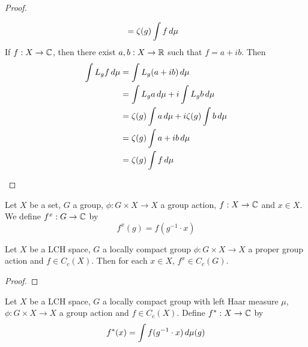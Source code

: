 \documentclass{book}
\begin{document}
\begin{proof}
\begin{enumerate}
\begin{align*}
			&= \zeta(g) \int f \, d \mu 
		\end{align*} 
		If $f:X \rightarrow \mathbb{C}$, then there exist $a,b:X \rightarrow \mathbb{R}$ such that $f = a + ib$. Then 
		\begin{align*}
			\int L_g f \, d \mu
			&= \int L_g(a + i b) \, d \mu \\
			&= \int L_g a \, d \mu +i \int L_g b \, d \mu \\
			&= \zeta(g) \int a \, d \mu + i \zeta(g) \int b \, d \mu \\
			&= \zeta(g) \int a + ib \, d \mu \\
			&= \zeta(g) \int f \, d \mu 
		\end{align*} 
		\end{enumerate}
	\end{proof}

	\begin{defn}
		Let $X$ be a set, $G$ a group, $\phi: G \times X \rightarrow X$ a group action, $f :X \rightarrow \mathbb{C}$ and $x \in X$. We define $f^x: G \rightarrow \mathbb{C}$ by $$f^x(g) = f(g^{-1} \cdot x)$$
	\end{defn}

	\begin{ex}
		Let $X$ be a LCH space, $G$ a locally compact group $\phi: G \times X \rightarrow X$ a proper group action and $f \in C_c(X)$. Then for each $x \in X$, $f^x \in C_c(G)$.  
	\end{ex}

	\begin{proof}
		
	\end{proof}

	\begin{ex}
		Let $X$ be a LCH space, $G$ a locally compact group with left Haar measure $\mu$, $\phi: G \times X \rightarrow X$ a group action and $f \in C_c(X)$. Define $f^* :X \rightarrow \mathbb{C}$ by $$f^*(x) = \int f(g^{-1} \cdot x) \, d \mu(g)$$  
	\end{ex}


	
	
	
	
	
	
	
	
	
	
	
	
	
	
	
	
	
	
	
	
	
	
	
	
\end{document}
